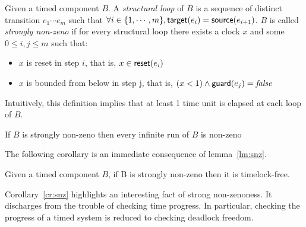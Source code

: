 \begin{definition}\label{def:snz}
  Given a timed component $B$. A \emph{structural loop} of $B$ is a sequence 
  of distinct transition $e_1\cdots e_m$ such that $\forall i\in\{1,\cdots,m
  \},\textsf{target}(e_i)= \textsf{source}(e_{i+1})$. $B$ is called \emph{strongly non-zeno} 
  if for every structural loop there exists a clock $x$ and some $0\le i,j
  \le m$ such that:
  \begin{itemize}
    \item $x$ is reset in step $i$, that is, $x\in\textsf{reset}(e_i)$
    \item $x$ is bounded from below in step j, that is, $(x<1)\wedge\textsf{guard}(e_j)
      =\textnormal{\textit{false}}$
  \end{itemize}
\end{definition}
Intuitively, this definition implies that at least 1 time unit is elapsed 
at each loop of $B$.

\begin{lemma}[\cite{}]\label{lm:snz}
  If $B$ is strongly non-zeno then every infinite run of $B$ is non-zeno
\end{lemma}

The following corollary is an immediate consequence of lemma~\ref{lm:snz}. 
\begin{corollary}\label{cr:snz}
Given a timed component $B$, if B is strongly non-zeno then it is 
  timelock-free.
\end{corollary}

Corollary~\ref{cr:snz} highlights an interesting fact of strong non-zenoness.
It discharges from the trouble of checking time progress. In particular, checking
the progress of a timed system is reduced to checking deadlock freedom.

